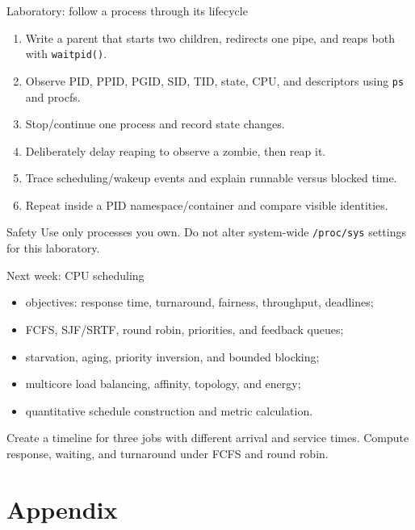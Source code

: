 \documentclass[aspectratio=169,11pt]{beamer}
\newcommand{\code}[1]{\texttt{#1}}
\begin{document}
\begin{frame}{Laboratory: follow a process through its lifecycle}
  \begin{enumerate}
    \item Write a parent that starts two children, redirects one pipe, and reaps both with \code{waitpid()}.
    \item Observe PID, PPID, PGID, SID, TID, state, CPU, and descriptors using \code{ps} and procfs.
    \item Stop/continue one process and record state changes.
    \item Deliberately delay reaping to observe a zombie, then reap it.
    \item Trace scheduling/wakeup events and explain runnable versus blocked time.
    \item Repeat inside a PID namespace/container and compare visible identities.
  \end{enumerate}
  \begin{alertblock}{Safety}
    Use only processes you own. Do not alter system-wide \code{/proc/sys} settings for this laboratory.
  \end{alertblock}
\end{frame}

\begin{frame}{Next week: CPU scheduling}
  \begin{itemize}
    \item objectives: response time, turnaround, fairness, throughput, deadlines;
    \item FCFS, SJF/SRTF, round robin, priorities, and feedback queues;
    \item starvation, aging, priority inversion, and bounded blocking;
    \item multicore load balancing, affinity, topology, and energy;
    \item quantitative schedule construction and metric calculation.
  \end{itemize}
  \begin{tcolorbox}[title=Preparation]
    Create a timeline for three jobs with different arrival and service times. Compute response, waiting, and turnaround under FCFS and round robin.
  \end{tcolorbox}
\end{frame}

\appendix
\section{Appendix}
\end{document}
